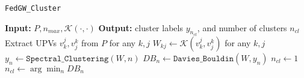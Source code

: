 \begin{algorithm}[t]
\caption{\texttt{FedGW\_Cluster}}\label{alg:fedgwcluster}
   \begin{algorithmic}[1]
     \STATE \textbf{Input:} $P, n_{max}, \mathcal{K}(\cdot,\cdot)$
     \STATE \textbf{Output:} cluster labels $y_{n_{cl}}$, and number of clusters $n_{cl}$
     \STATE Extract UPVs $v_k^j, v_j^k$ from $P$ for any $k,j$
     \STATE $W_{kj}\gets \mathcal{K}(v_k^j,v_j^k)$ for any $k,j$
     \STATE $y_{n} \gets \texttt{Spectral\_Clustering}(W,n)$
     \STATE $DB_n \gets \texttt{Davies\_Bouldin}(W,y_n)$
     \STATE $n_{cl} \gets 1$
     \ELSE 
     \STATE$n_{cl} \gets \arg \min_n DB_n$
     \ENDIF
    
    \ENDFOR
   \end{algorithmic}
\end{algorithm}


